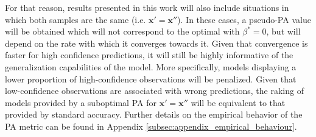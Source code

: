 For that reason, results presented in this work will also include situations in which both
samples are the same (i.e. $\bm{x}' = \bm{x}''$). In these cases, a pseudo-PA value will be 
obtained which will not correspond to the optimal with $\beta^{*}=0$, but will depend on the
rate with which it converges towards it. Given that convergence is faster for high confidence 
predictions, it will still be highly informative of the generalization capabilities of the model. More
specifically, models displaying a lower proportion of high-confidence observations will be 
penalized. Given that low-confidence observations are associated with wrong predictions, the 
raking of models provided by a suboptimal PA for $\bm{x}' = \bm{x}''$ will be equivalent 
to that provided by standard accuracy. Further details on the empirical behavior of the PA
metric can be found in Appendix \ref{subsec:appendix_empirical_behaviour}.

